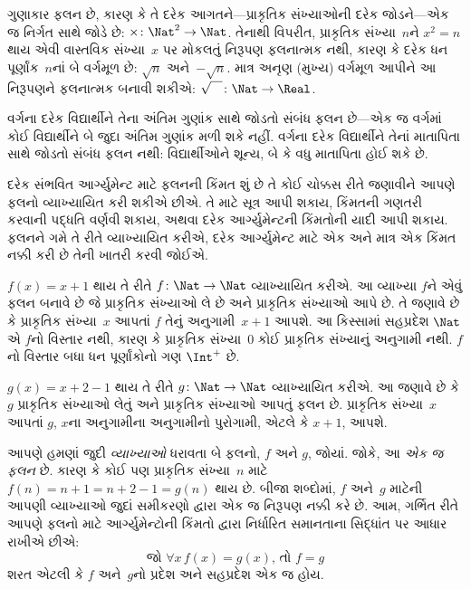 \documentclass[../../../include/open-logic-section]{subfiles}
\begin{document}
\begin{ex}
ગુણાકાર ફલન છે, કારણ કે તે દરેક આગતને---પ્રાકૃતિક સંખ્યાઓની
દરેક જોડને---એક જ નિર્ગત સાથે જોડે છે:
$\times \colon \Nat^2 \to
\Nat$. તેનાથી વિપરીત, પ્રાકૃતિક સંખ્યા~$n$ને
$x^2 = n$ થાય એવી વાસ્તવિક સંખ્યા~$x$ પર મોકલતું નિરૂપણ
ફલનાત્મક નથી, કારણ કે દરેક ધન પૂર્ણાંક~$n$નાં બે વર્ગમૂળ
છે: $\sqrt{n}$ અને~$-\sqrt{n}$. માત્ર અનૃણ (મુખ્ય) વર્ગમૂળ આપીને
આ નિરૂપણને ફલનાત્મક બનાવી શકીએ:
$\sqrt{\phantom{X}} \colon
\Nat \to \Real$.
\end{ex}

\begin{ex}
વર્ગના દરેક વિદ્યાર્થીને તેના અંતિમ ગુણાંક સાથે જોડતો સંબંધ
ફલન છે---એક જ વર્ગમાં કોઈ વિદ્યાર્થીને બે જુદા અંતિમ
ગુણાંક મળી શકે નહીં. વર્ગના દરેક વિદ્યાર્થીને તેનાં
માતાપિતા સાથે જોડતો સંબંધ ફલન નથી: વિદ્યાર્થીઓને
શૂન્ય, બે કે વધુ માતાપિતા હોઈ શકે છે.
\end{ex}

\begin{explain}
દરેક સંભવિત આર્ગ્યુમેન્ટ માટે ફલનની કિંમત શું છે તે કોઈ ચોક્કસ
રીતે જણાવીને આપણે ફલનો વ્યાખ્યાયિત કરી શકીએ છીએ.
તે માટે સૂત્ર આપી શકાય, કિંમતની ગણતરી કરવાની પદ્ધતિ
વર્ણવી શકાય, અથવા દરેક આર્ગ્યુમેન્ટની કિંમતોની યાદી આપી શકાય.
ફલનને ગમે તે રીતે વ્યાખ્યાયિત કરીએ, દરેક આર્ગ્યુમેન્ટ માટે
એક અને માત્ર એક કિંમત નક્કી કરી છે તેની ખાતરી કરવી જોઈએ.
\end{explain}

\begin{ex}
$f(x) = x+1$ થાય તે રીતે $f \colon \Nat \to \Nat$
વ્યાખ્યાયિત કરીએ. આ વ્યાખ્યા $f$ને એવું ફલન બનાવે છે
જે પ્રાકૃતિક સંખ્યાઓ લે છે અને પ્રાકૃતિક સંખ્યાઓ આપે છે.
તે જણાવે છે કે પ્રાકૃતિક સંખ્યા~$x$ આપતાં $f$ તેનું
અનુગામી~$x+1$ આપશે.
આ કિસ્સામાં સહપ્રદેશ $\Nat$ એ $f$નો વિસ્તાર નથી,
કારણ કે પ્રાકૃતિક સંખ્યા~$0$ કોઈ પ્રાકૃતિક સંખ્યાનું
અનુગામી નથી. $f$નો વિસ્તાર બધા ધન પૂર્ણાંકોનો ગણ
$\Int^{+}$ છે.
\end{ex}

\begin{ex}
$g(x) = x+2-1$ થાય તે રીતે $g \colon \Nat \to \Nat$
વ્યાખ્યાયિત કરીએ. આ જણાવે છે કે $g$ પ્રાકૃતિક સંખ્યાઓ
લેતું અને પ્રાકૃતિક સંખ્યાઓ આપતું ફલન છે.
પ્રાકૃતિક સંખ્યા~$x$ આપતાં $g$, $x$ના અનુગામીના
અનુગામીનો પુરોગામી, એટલે કે $x+1$, આપશે.
\end{ex}

\begin{explain}
આપણે હમણાં જુદી \emph{વ્યાખ્યાઓ} ધરાવતા બે ફલનો,
$f$ અને $g$, જોયાં. જોકે, આ \emph{એક જ ફલન} છે.
કારણ કે કોઈ પણ પ્રાકૃતિક સંખ્યા~$n$ માટે
$f(n) = n+1 = n+2-1 =
g(n)$ થાય છે. બીજા શબ્દોમાં, $f$ અને~$g$ માટેની આપણી
વ્યાખ્યાઓ જુદાં સમીકરણો દ્વારા એક જ નિરૂપણ નક્કી કરે છે.
આમ, ગર્ભિત રીતે આપણે ફલનો માટે આર્ગ્યુમેન્ટોની કિંમતો દ્વારા
નિર્ધારિત સમાનતાના સિદ્ધાંત પર આધાર રાખીએ છીએ:
\[
  \text{જો }\forall x\, f(x) = g(x)\text{, તો }f = g
\]
શરત એટલી કે $f$ અને~$g$નો પ્રદેશ અને સહપ્રદેશ એક જ હોય.
\end{explain}
\end{document}
